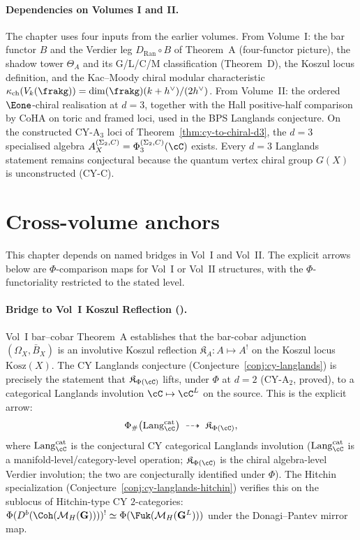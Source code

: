 \paragraph{Dependencies on Volumes I and II.}
The chapter uses four inputs from the earlier volumes.
From Volume~I: the bar functor $B$ and the Verdier leg $D_{\mathrm{Ran}} \circ B$ of Theorem~A (four-functor picture), the shadow tower $\Theta_A$ and its G/L/C/M classification (Theorem~D), the Koszul locus definition, and the Kac--Moody chiral modular characteristic $\kappa_{\mathrm{ch}}(V_k(\frakg)) = \dim(\frakg)(k + h^\vee)/(2 h^\vee)$.
From Volume~II: the ordered $\Eone$-chiral realisation at $d = 3$, together with the Hall positive-half comparison by CoHA on toric and framed loci, used in the BPS Langlands conjecture.
On the constructed CY-A$_3$ loci of Theorem~\ref{thm:cy-to-chiral-d3}, the $d = 3$ specialised algebra \(A_X^{(\Sigma_2,C)}=\Phi_3^{(\Sigma_2,C)}(\cC)\) exists. Every $d = 3$ Langlands statement remains conjectural because the quantum vertex chiral group $G(X)$ is unconstructed (CY-C).


\section{Cross-volume anchors}
\label{sec:geom-langlands-cross-volume-anchors}

This chapter depends on named bridges in Vol~I and Vol~II. The explicit
arrows below are \(\Phi\)-comparison maps for Vol~I or Vol~II structures,
with the \(\Phi\)-functoriality restricted to the stated level.

\paragraph{Bridge to Vol~I Koszul Reflection (\cite{VolI}).}
Vol~I bar--cobar Theorem~A establishes that the bar-cobar adjunction $(\Omega_X, \bar B_X)$ is an involutive Koszul reflection $\mathfrak{K}_A \colon A \mapsto A^!$ on the Koszul locus $\mathrm{Kosz}(X)$. The CY Langlands conjecture \textup{(}Conjecture~\ref{conj:cy-langlands}\textup{)} is precisely the statement that $\mathfrak{K}_{\Phi(\cC)}$ lifts, under $\Phi$ at $d = 2$ \textup{(}CY-A$_2$, proved\textup{),} to a categorical Langlands involution $\cC \mapsto \cC^L$ on the source. This is the explicit arrow:
\[
 \Phi_\#\bigl(\mathrm{Lang}_\cC^{\mathrm{cat}}\bigr)
 \;\dashrightarrow\;
 \mathfrak{K}_{\Phi(\cC)},
\]
where $\mathrm{Lang}_\cC^{\mathrm{cat}}$ is the conjectural CY categorical Langlands involution \textup{(}$\mathrm{Lang}_\cC^{\mathrm{cat}}$ is a manifold-level/category-level operation; $\mathfrak{K}_{\Phi(\cC)}$ is the chiral algebra-level Verdier involution; the two are conjecturally identified under $\Phi$\textup{).} The Hitchin specialization \textup{(}Conjecture~\ref{conj:cy-langlands-hitchin}\textup{)} verifies this on the sublocus of Hitchin-type CY $2$-categories: $\Phi(D^b(\Coh(\mathcal{M}_H(\mathbf{G}))))^! \simeq \Phi(\Fuk(\mathcal{M}_H(\mathbf{G}^L)))$ under the Donagi--Pantev mirror map.

